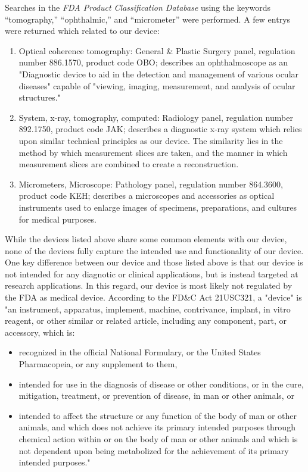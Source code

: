 \documentclass{article}
\begin{document}
Searches in the \textit{FDA Product Classification Database} using the
keywords ``tomography,'' ``ophthalmic,'' and ``micrometer'' were
performed. A few entrys were returned which related to our device:

\begin{enumerate}
\item Optical coherence tomography: General \& Plastic Surgery panel,
  regulation number 886.1570, product code OBO; describes an
  ophthalmoscope as an "Diagnostic device to aid in the detection and
  management of various ocular diseases" capable of "viewing, imaging,
  measurement, and analysis of ocular structures."
\item System, x-ray, tomography, computed: Radiology panel, regulation
  number 892.1750, product code JAK; describes a diagnostic x-ray
  system which relies upon similar technical principles as our
  device. The similarity lies in the method by which measurement
  slices are taken, and the manner in which measurement slices are
  combined to create a reconstruction.
\item Micrometers, Microscope: Pathology panel, regulation number
  864.3600, product code KEH; describes a microscopes and accessories
  as optical instruments used to enlarge images of specimens,
  preparations, and cultures for medical purposes.
\end{enumerate}

While the devices listed above share some common elements with our
device, none of the devices fully capture the intended use and
functionality of our device. One key difference between our device and
those listed above is that our device is not intended for any
diagnotic or clinical applications, but is instead targeted at
research applications. In this regard, our device is most likely not
regulated by the FDA as medical device. According to the FD\&C Act
21USC321, a "device" is "an instrument, apparatus, implement, machine,
contrivance, implant, in vitro reagent, or other similar or related
article, including any component, part, or accessory, which is:

\begin{itemize}
\item recognized in the official National Formulary, or the United
  States Pharmacopeia, or any supplement to them,
\item intended for use in the diagnosis of disease or other
  conditions, or in the cure, mitigation, treatment, or prevention of
  disease, in man or other animals, or
\item intended to affect the structure or any function of the body of
  man or other animals, and which does not achieve its primary
  intended purposes through chemical action within or on the body of
  man or other animals and which is not dependent upon being
  metabolized for the achievement of its primary intended purposes."
\end{itemize}
\end{document}
